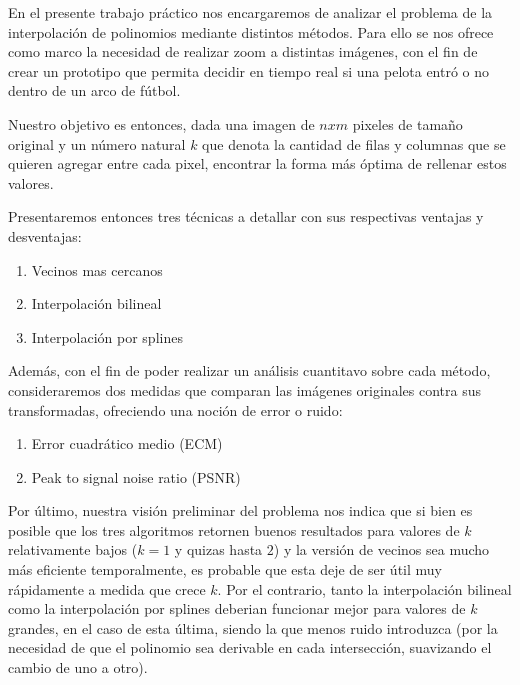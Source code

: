 En el presente trabajo práctico nos encargaremos de analizar el problema de la interpolación de polinomios mediante distintos métodos.
Para ello se nos ofrece como marco la necesidad de realizar zoom a distintas imágenes, con el fin de crear un prototipo que permita decidir en tiempo
real si una pelota entró o no dentro de un arco de fútbol.

Nuestro objetivo es entonces, dada una imagen de $n x m$ pixeles de tamaño original y un número natural $k$ que denota la cantidad de filas y
columnas que se quieren agregar entre cada pixel, encontrar la forma más óptima de rellenar estos valores.

Presentaremos entonces tres técnicas a detallar con sus respectivas ventajas y desventajas:
\begin{enumerate}
 \item Vecinos mas cercanos
 \item Interpolación bilineal
 \item Interpolación por splines
\end{enumerate}

Además, con el fin de poder realizar un análisis cuantitavo sobre cada método, consideraremos dos medidas que comparan las imágenes
originales contra sus transformadas, ofreciendo una noción de error o ruido:
\begin{enumerate}
 \item Error cuadrático medio (ECM)
 \item Peak to signal noise ratio (PSNR)
\end{enumerate}

Por último, nuestra visión preliminar del problema nos indica que si bien es posible que los tres algoritmos retornen buenos resultados
para valores de $k$ relativamente bajos ($k = 1$ y quizas hasta $2$) y la versión de vecinos sea mucho más eficiente temporalmente,
es probable que esta deje de ser útil muy rápidamente a medida que crece $k$. Por el contrario, tanto la interpolación bilineal como la
interpolación por splines deberian funcionar mejor para valores de $k$ grandes, en el caso de esta última, siendo la que menos ruido introduzca
(por la necesidad de que el polinomio sea derivable en cada intersección, suavizando el cambio de uno a otro).
